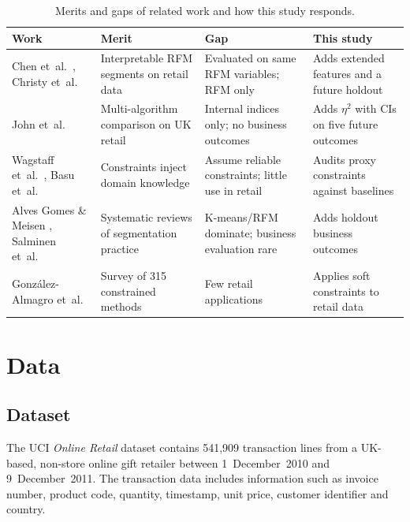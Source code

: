 \documentclass[conference,10pt]{IEEEtran}
\newcommand{\etasq}{\eta^{2}}
\begin{document}
\begin{table}[t]
\centering
\caption{Merits and gaps of related work and how this study responds.}
\label{tab:litgap}
\footnotesize
\setlength{\tabcolsep}{3pt}
\begin{tabular}{L{1.55cm}L{2.05cm}L{2.05cm}L{1.85cm}}
\toprule
\textbf{Work} & \textbf{Merit} & \textbf{Gap} & \textbf{This study}\\
\midrule
Chen et~al.\ \cite{chen2012rfm}, Christy et~al.\ \cite{christy2021rfm}
& Interpretable RFM segments on retail data
& Evaluated on same RFM variables; RFM only
& Adds extended features and a future holdout\\
\addlinespace
John et~al.\ \cite{john2023exploration}
& Multi-algorithm comparison on UK retail
& Internal indices only; no business outcomes
& Adds $\etasq$ with CIs on five future outcomes\\
\addlinespace
Wagstaff et~al.\ \cite{wagstaff2001constrained}, Basu et~al.\ \cite{basu2004probabilistic}
& Constraints inject domain knowledge
& Assume reliable constraints; little use in retail
& Audits proxy constraints against baselines\\
\addlinespace
Alves Gomes \& Meisen \cite{gomes2023review}, Salminen et~al.\ \cite{salminen2023algorithms}
& Systematic reviews of segmentation practice
& K-means/RFM dominate; business evaluation rare
& Adds holdout business outcomes\\
\addlinespace
Gonz\'alez-Almagro et~al.\ \cite{gonzalez2025semi}
& Survey of 315 constrained methods
& Few retail applications
& Applies soft constraints to retail data\\
\bottomrule
\end{tabular}
\end{table}

\section{Data}
\label{sec:data}

\subsection{Dataset}
The UCI \emph{Online Retail} dataset \cite{uci2015onlineretail} contains
541,909 transaction lines from a UK-based, non-store online gift retailer
between 1~December~2010 and 9~December~2011. The transaction data includes information such as invoice number, product
code, quantity, timestamp, unit price, customer identifier and
country.
\end{document}
